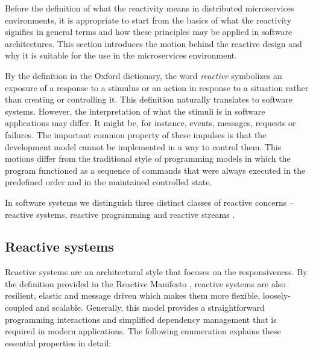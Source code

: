 \documentclass[oneside,
  digital, %
  table,   %
  lof,     %
  lot,     %
]{fithesis3}
\begin{document}
Before the definition of what the reactivity means in distributed microservices environments, it is appropriate to start from the basics of what the reactivity signifies in general terms and how these principles may be applied in software architectures. This section introduces the motion behind the reactive design and why it is suitable for the use in the microservices environment.

By the definition in the Oxford dictionary, the word \textit{reactive} symbolizes an exposure of a response to a stimulus or an action in response to a situation rather than creating or controlling it. This definition naturally translates to software systems. However, the interpretation of what the stimuli is in software applications may differ. It might be, for instance, events, messages, requests or failures. The important common property of these impulses is that the development model cannot be implemented in a way to control them. This motions differ from the traditional style of programming models in which the program functioned as a sequence of commands that were always executed in the predefined order and in the maintained controlled state.

In software systems we distinguish three distinct classes of reactive concerns -- reactive systems, reactive programming and reactive streams \cite{reactive_landscape}. 

\subsection{Reactive systems}

Reactive systems are an architectural style that focuses on the responsiveness. By the definition provided in the Reactive Manifesto \cite{reactive_manifesto}, reactive systems are also resilient, elastic and message driven which makes them more flexible, loosely-coupled and scalable. Generally, this model provides a straightforward programming interactions and simplified dependency management that is required in modern applications. The following enumeration explains these essential properties in detail:
\end{document}
